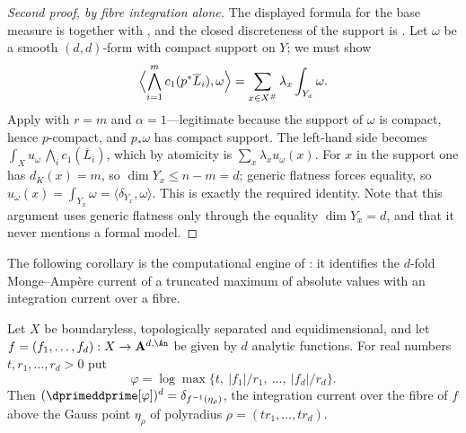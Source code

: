 \begin{proof}[Second proof, by fibre integration alone]
The displayed formula for the base measure is
 together with
, and the closed discreteness of the support
is .  Let $\omega$ be a smooth
$(d,d)$-form with compact support on $Y$; we must show
\[
 \Bigl\langle\bigwedge_{i=1}^mc_1(p^*\overline L_i),\omega\Bigr\rangle
 =\sum_{x\in X^{\#}}\lambda_x\int_{Y_x}\omega .
\]
Apply  with $r=m$ and
$\alpha=1$---legitimate because the support of $\omega$ is compact,
hence $p$-compact, and $p_*\omega$ has compact support.  The left-hand
side becomes $\int_Xu_\omega\,\bigwedge_ic_1(\overline L_i)$, which by
atomicity is $\sum_{x}\lambda_xu_\omega(x)$.  For $x$ in the support one
has $d_K(x)=m$, so $\dim Y_x\le n-m=d$; generic flatness forces
equality, so $u_\omega(x)=\int_{Y_x}\omega=\langle\delta_{Y_x},\omega\rangle$.
This is exactly the required identity.  Note that this argument uses
generic flatness only through the equality $\dim Y_x=d$, and that it never
mentions a formal model.
\end{proof}

The following corollary is the computational engine of
: it identifies the $d$-fold Monge--Amp\`ere
current of a truncated maximum of absolute values with an integration
current over a fibre.

\begin{corollary}
\label{cor:ch17-truncated-max-fibre}
Let $X$ be boundaryless, topologically separated and equidimensional, and
let $f=(f_1,\dots,f_d):X\to\mathbf A^{d,\An}$ be given by $d$ analytic
functions.  For real numbers $t,r_1,\dots,r_d>0$ put
\[
 \varphi=\log\max\{t,\ |f_1|/r_1,\ \dots,\ |f_d|/r_d\}.
\]
Then $(\dprimeddprime[\varphi])^d=\delta_{f^{-1}(\eta_\rho)}$, the
integration current over the fibre of $f$ above the Gauss point
$\eta_\rho$ of polyradius $\rho=(tr_1,\dots,tr_d)$.
\end{corollary}

